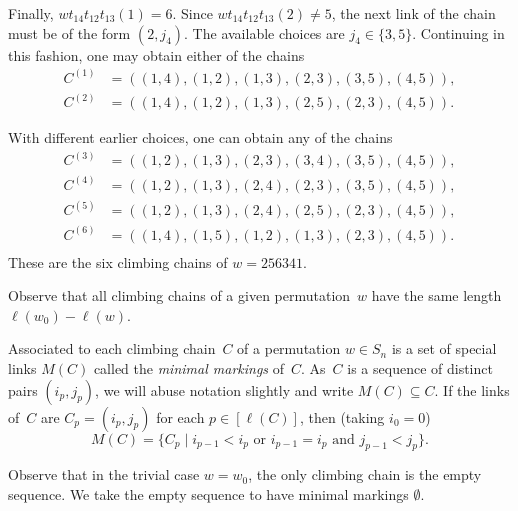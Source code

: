 \documentclass[ALCO]{cedram}
\begin{document}
\begin{example}
\begin{center}
	\end{center}
	
	Finally, $wt_{14}t_{12}t_{13}(1)=6$. Since $wt_{14}t_{12}t_{13}(2)\neq 5$, the next link of the chain must be of the form $(2,j_4)$. The available choices are $j_4\in \{3,5\}$. Continuing in this fashion, one may obtain either of the chains
	\begin{align*}
		C^{(1)} &= ((1,4),(1,2),(1,3),(2,3),(3,5),(4,5)),\\
		C^{(2)} &= ((1,4),(1,2),(1,3),(2,5),(2,3),(4,5)).
	\end{align*}
	
	With different earlier choices, one can obtain any of the chains
	\begin{align*}
		C^{(3)} &= ((1,2),(1,3),(2,3),(3,4),(3,5),(4,5)),\\
		C^{(4)} &= ((1,2),(1,3),(2,4),(2,3),(3,5),(4,5)),\\
		C^{(5)} &= ((1,2),(1,3),(2,4),(2,5),(2,3),(4,5)),\\
		C^{(6)} &= ((1,4),(1,5),(1,2),(1,3),(2,3),(4,5)).\\
	\end{align*}
	These are the six climbing chains of $w=256341$.
\end{example}

Observe that all climbing chains of a given permutation~$w$ have the same length $\ell(w_0)-\ell(w)$.

\begin{definition}
	Associated to each climbing chain~$C$ of a permutation $w\in S_n$ is a set of special links $M(C)$ called the \emph{minimal markings} of~$C$. As~$C$ is a sequence of distinct pairs $(i_p,j_p)$, we will abuse notation slightly and write $M(C)\subseteq C$. If the links of~$C$ are $C_p=(i_p,j_p)$ for each $p\in [\ell(C)]$, then (taking $i_0=0$)
	\[M(C)=\{C_p \mid i_{p-1}<i_{p} \mbox{ or } i_{p-1}=i_p \mbox{ and } j_{p-1}<j_p\}. \]
\end{definition}

Observe that in the trivial case $w=w_0$, the only climbing chain is the empty sequence. We take the empty sequence to have minimal markings $\emptyset$.
\end{document}
